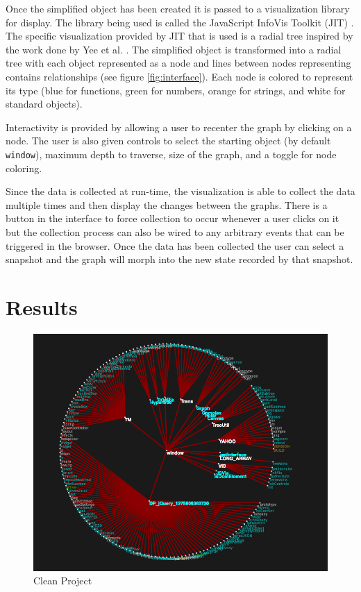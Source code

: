 \documentclass[]{article}
\begin{document}
Once the simplified object has been created it is passed to a visualization library for display. The library being used is called the JavaScript InfoVis Toolkit (JIT) \cite{jit}. The specific visualization provided by JIT that is used is a radial tree inspired by the work done by Yee et al. \cite{yee2001animated}. The simplified object is transformed into a radial tree with each object represented as a node and lines between nodes representing contains relationships (see figure \ref{fig:interface}). Each node is colored to represent its type (blue for functions, green for numbers, orange for strings, and white for standard objects). 

Interactivity is provided by allowing a user to recenter the graph by clicking on a node. The user is also given controls to select the starting object (by default {\tt window}), maximum depth to traverse, size of the graph, and a toggle for node coloring. 

Since the data is collected at run-time, the visualization is able to collect the data multiple times and then display the changes between the graphs. There is a button in the interface to force collection to occur whenever a user clicks on it but the collection process can also be wired to any arbitrary events that can be triggered in the browser. Once the data has been collected the user can select a snapshot and the graph will morph into the new state recorded by that snapshot.


\section{Results}
\label{sec:results}

\begin{figure}[h]
  \begin{center}
    \includegraphics[scale=.35]{clean.png}
  \end{center}
  \caption{Clean Project}
  \label{fig:clean}
\end{figure}
\end{document}
